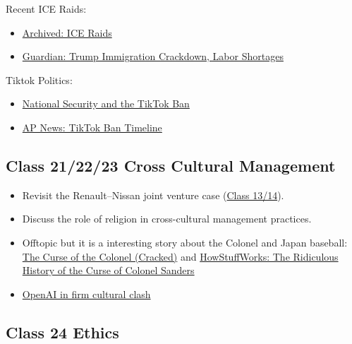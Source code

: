 \documentclass[
  11pt,
]{article}
\providecommand{\tightlist}{%
  \setlength{\itemsep}{0pt}\setlength{\parskip}{0pt}}
\begin{document}
Recent ICE Raids:

\begin{itemize}
\tightlist
\item
  \href{https://archive.ph/pp4xl}{Archived: ICE Raids}
\item
  \href{https://www.theguardian.com/us-news/2025/jul/29/trump-immigration-crackdown-labor-shortages-slowdowns}{Guardian:
  Trump Immigration Crackdown, Labor Shortages}
\end{itemize}

Tiktok Politics:

\begin{itemize}
\tightlist
\item
  \href{https://www.american.edu/sis/news/20250123-national-security-and-the-tik-tok-ban.cfm}{National
  Security and the TikTok Ban}
\item
  \href{https://apnews.com/article/tiktok-ban-biden-timeline-india-119969bfc584e92d47baa189a3e1c4fc}{AP
  News: TikTok Ban Timeline}
\end{itemize}

\subsection{Class 21/22/23 Cross Cultural
Management}\label{class-212223-cross-cultural-management}

\begin{itemize}
\tightlist
\item
  Revisit the Renault--Nissan joint venture case
  (\hyperref[class13-14]{Class 13/14}).
\item
  Discuss the role of religion in cross-cultural management practices.
\item
  Offtopic but it is a interesting story about the Colonel and Japan
  baseball:
  \href{https://www.cracked.com/article_44709_the-japanese-baseball-team-cursed-by-colonel-sanders.html}{The
  Curse of the Colonel (Cracked)} and
  \href{https://history.howstuffworks.com/american-history/ridiculous-history-curse-colonel.htm}{HowStuffWorks:
  The Ridiculous History of the Curse of Colonel Sanders}
\item
  \href{https://archive.ph/rR3Gt\#selection-565.3-593.46}{OpenAI in firm
  cultural clash}
\end{itemize}

\subsection{Class 24 Ethics}\label{class-24-ethics}
\end{document}
